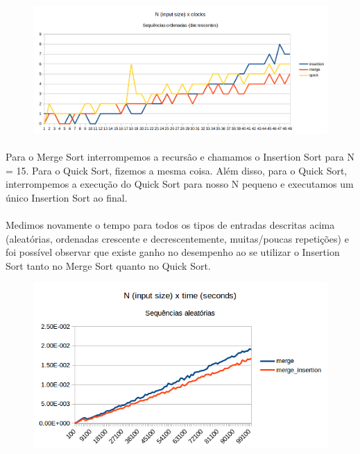 \documentclass[11pt,a4paper]{article}
\begin{document}
\begin{figure}[htb]
  \begin{center}
      \includegraphics[width=1\textwidth]{insertion_choice}
  \end{center}
      \label{fig:k}
\end{figure}

    \paragraph{}
    Para o Merge Sort interrompemos a recursão e chamamos o Insertion Sort para N = 15. Para o Quick Sort, fizemos a mesma coisa. Além disso, para o Quick Sort, interrompemos a execução do Quick Sort para nosso N pequeno e executamos um único Insertion Sort ao final.

    \paragraph{}
    Medimos novamente o tempo para todos os tipos de entradas descritas acima (aleatórias, ordenadas crescente e decrescentemente, muitas/poucas repetições) e foi possível observar que existe ganho no desempenho ao se utilizar o Insertion Sort tanto no Merge Sort quanto no Quick Sort. 

\begin{figure}[htb]
  \begin{center}
      \includegraphics[width=1\textwidth,scale=0.8]{mergesort_insertion}
  \end{center}
      \label{fig:l}
\end{figure}
\end{document}
